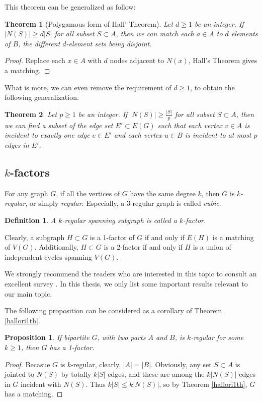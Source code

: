 \documentclass[12pt]{report}
\newtheorem{theorem}{Theorem}
\newtheorem{definition}{Definition}
\newtheorem{proposition}{Proposition}
\begin{document}
This theorem can be generalized as follow:
\begin{theorem}[Polygamous form of Hall' Theorem]
Let $d\ge1$ be an integer. If $|N(S)|\ge d|S|$ for all subset $S\subset A$, then we can match each $a\in A$ to $d$ elements of $B$, the different $d$-element sets being disjoint.
\end{theorem}
\begin{proof}

Replace each $x\in A$ with $d$ nodes adjacent to $N(x)$, Hall's Theorem gives a matching.

\end{proof}


What is more, we can even remove the requirement of $d\ge1$, to obtain the following generalization.
\begin{theorem}\label{zuiqianghallt}
Let $p\ge1$ be an integer. If $|N(S)|\ge\frac{|S|}{p}$ for all subset $S\subset A$, then we can find a subset of the edge set $E'\subset E(G)$ such that each vertex $v\in A$ is incident to exactly one edge $e\in E'$ and each vertex $u\in B$ is incident to at most $p$ edges in $E'$.
\end{theorem}





\subsection{$k$-factors}


For any graph $G$, if all the vertices of $G$ have the same degree $k$, then $G$ is {\em $k$-regular}, or simply {\em regular}. Especially, a 3-regular graph is called {\em cubic}.
\begin{definition}
A $k$-regular spanning subgraph is called a $k$-factor.
\end{definition}
Clearly, a subgraph $H\subset G$ is a 1-factor of $G$ if and only if $E(H)$ is a matching of $V(G)$. Additionally, $H\subset G$ is a 2-factor if and only if $H$ is a union of independent cycles spanning $V(G)$.

We strongly recommend the readers who are interested in this topic to consult an excellent survey \cite{plummer2007graph}. In this thesis, we only list some important results relevant to our main topic.


The following proposition can be considered as a corollary of Theorem \ref{hallori1th}.

\begin{proposition}\label{propkrto1f}
If bipartite $G$, with two parts $A$ and $B$, is $k$-regular for some $k\ge1$, then $G$ has a 1-factor.
\end{proposition}
\begin{proof}
Becasue $G$ is $k$-regular, clearly, $|A|=|B|$. Obviously, any set $S\subset A$ is jointed to $N(S)$ by totally $k|S|$ edges, and these are among the $k|N(S)|$ edges in $G$ incident with $N(S)$. Thus $k|S|\le k|N(S)|$, so by Theorem \ref{hallori1th}, $G$ has a matching.




\end{proof}
\end{document}
